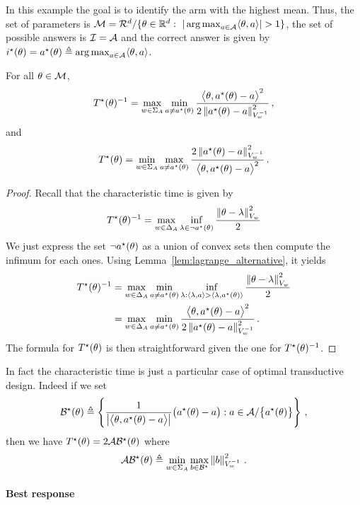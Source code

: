 In this example the goal is to identify the arm with the highest mean. Thus, the set of parameters is $\cM=\cR^d/\{\theta\in\R^d:\  |\argmax_{a\in\cA} \langle\theta,a\rangle|>1\}$, the set of possible answers is $\mathcal{I} = \mathcal{A}$ and the correct answer is given by $i^\star(\theta)=a^\star(\theta)\triangleq \operatorname*{arg\,max}_{a\in\mathcal{A}} \langle\theta,a\rangle$.
\begin{lemma}
\label{lem:complexity_bai}
For all $\theta\in \mathcal{M}$,
\[
T^{\star}(\theta)^{-1} = \max_{w\in\Sigma_A} \min_{a\neq a^\star(\theta)} \frac{\big\langle \theta, a^\star(\theta)-a\big\rangle^2}{2 \left\lVert a^\star(\theta)-a\right\rVert_{V_w^{-1}}^2}\,,
\]
and
\[
T^{\star}(\theta) = \min_{w\in\Sigma_A} \max_{a\neq a^\star(\theta)} \frac{2\left\lVert a^\star(\theta)-a\right\rVert_{V_w^{-1}}^2}{\big\langle \theta, a^\star(\theta)-a\big\rangle^2}\,.
\]
\end{lemma}
\begin{proof}
Recall that the characteristic time is given by
\[
T^{\star}(\theta)^{-1} = \max_{w \in \Delta_A} \inf_{\lambda\in \neg a^\star(\theta)} \frac{\left\lVert\theta - \lambda\right\rVert_{V_w}^2}{2}
\]
We just express the set $\neg a^\star(\theta)$ as a union of convex sets then compute the infimum for each ones. Using Lemma~\ref{lem:lagrange_alternative}, it yields
\begin{align*}
  T^{\star}(\theta)^{-1} &= \max_{w \in \Delta_A} \min_{a \neq a^\star(\theta)} \inf_{\lambda: \langle\lambda,a\rangle > \langle\lambda,a^\star(\theta)\rangle} \frac{\left\lVert\theta - \lambda\right\rVert_{V_w}^2}{2}\\
  &= \max_{w \in \Delta_A} \min_{a \neq a^\star(\theta)} \frac{\big\langle \theta, a^\star(\theta)-a\big\rangle^2}{2 \left\lVert a^\star(\theta)-a\right\rVert_{V_w^{-1}}^2}\,.
\end{align*}
The formula for $T^{\star}(\theta)$ is then straightforward given the one for  $T^{\star}(\theta)^{-1}$.

\end{proof}
In fact the characteristic time is just a particular case of optimal transductive design. Indeed if we set
\[
\mathcal{B}^\star(\theta) \triangleq \left\{ \frac{1}{\left|\big\langle \theta, a^\star(\theta)-a\big\rangle\right|}\big(a^\star(\theta)- a\big): a\in\mathcal{A}/\big\{a^\star(\theta)\big\}  \right\}\,,
\]
then we have $T^{\star}(\theta) = 2 \mathcal{A}\mathcal{B}^\star(\theta)$ where
\[
\mathcal{A}\mathcal{B}^\star(\theta) \triangleq  \min_{w\in\Sigma_A} \max_{b\in \mathcal{B}^\star} \left\lVert b\right\rVert_{V_w^{-1}}^2\,.
\]

\paragraph{Best response}


